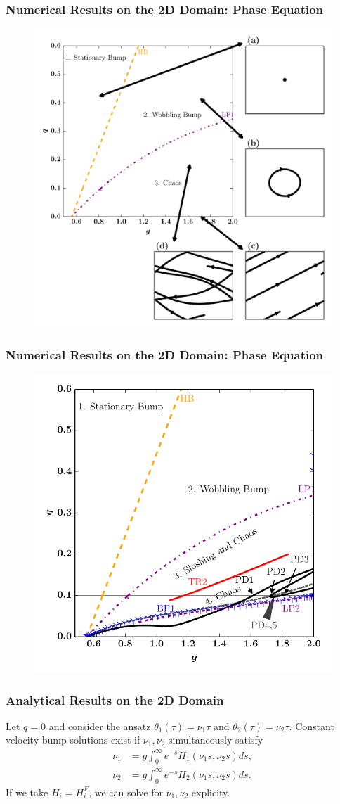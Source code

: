 \documentclass{beamer}
\begin{document}
\begin{frame}
\frametitle{Numerical Results on the 2D Domain: Phase Equation}
\begin{figure}
 \includegraphics[width=.6\textwidth]{twod_phase_2par4.pdf}

\end{figure}
\end{frame}

\begin{frame}
\frametitle{Numerical Results on the 2D Domain: Phase Equation}
\begin{figure}
 \includegraphics[width=.6\textwidth]{twod_phase_auto_3terms_2par.pdf}

\end{figure}
\end{frame}



\begin{frame}
\frametitle{Analytical Results on the 2D Domain}
Let $q=0$ and consider the ansatz $\theta_1(\tau) = \nu_1\tau$ and $\theta_2(\tau) = \nu_2\tau$. Constant velocity bump solutions exist if $\nu_1,\nu_2$ simultaneously satisfy
\begin{equation*}
\begin{split}
 \nu_1 &=  g \int_0^\infty e^{-s} H_1(\nu_1 s,\nu_2 s) ds,\\
 \nu_2 &=  g \int_0^\infty e^{-s} H_2(\nu_1 s,\nu_2 s) ds.
\end{split}
\end{equation*}
If we take $H_i = H_i^F$, we can solve for $\nu_1,\nu_2$ explicity.
\end{frame}
\end{document}

